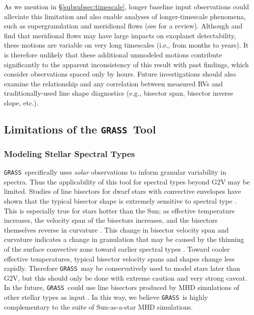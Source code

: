 \documentclass[twocolumn]{aastex63}
\newcommand{\grass}{\texttt{GRASS}}
\newcommand{\revise}[1]{#1}
\begin{document}
As we mention in \S\ref{subsubsec:timescale}, longer baseline input observations could alleviate this limitation and also enable analyses of longer-timescale phenomena, such as supergranulation and meridional flows (see \citealt{Cegla2019b} for a review). \revise{Although \citet{Makarov2010} and \citet{Meunier2020b} find that meridional flows may have large impacts on exoplanet detectability, these motions are variable on very long timescales (i.e., from months to years). It is therefore unlikely that these additional unmodeled motions contribute significantly to the apparent inconsistency of this result with past findings, which consider observations spaced only by hours.} Future investigations should also examine the relationship and any correlation between measured RVs and traditionally-used line shape diagnostics (e.g., bisector span, bisector inverse slope, etc.). \par

\subsection{Limitations of the \grass\ Tool} \label{subsec:limits}
\subsubsection{Modeling Stellar Spectral Types}
\grass\ specifically uses \textit{solar} observations to inform granular variability in spectra. Thus the applicability of this tool for spectral types beyond G2V may be limited. Studies of line bisectors for dwarf stars with convective envelopes have shown that the typical bisector shape is extremely sensitive to spectral type \citep[Figure 17.15 of][]{Gray2008}. This is especially true for stars hotter than the Sun; as effective temperature increases, the velocity span of the bisectors increases, and the bisectors themselves reverse in curvature \citep[Figure 17.16 of][]{Gray2008}. This change in bisector velocity span and curvature indicates a change in granulation that may be caused by the thinning of the surface convective zone toward earlier spectral types \citep{Kippenhahn2012}. Toward cooler effective temperatures, typical bisector velocity spans and shapes change less rapidly. Therefore \grass\ may be conservatively used to model stars later than G2V, but this should only be done with extreme caution and \revise{very} strong caveat. In the future, \grass\ could use line bisectors produced by MHD simulations of other stellar types as input \citep{Dravins2021}. In this way, we believe \grass\ is highly complementary to the suite of Sun-as-a-star MHD simulations. \par
\end{document}

